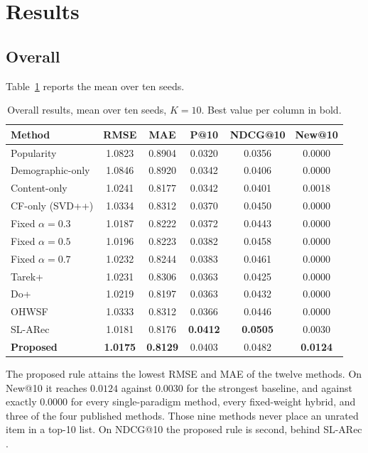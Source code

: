 \documentclass[conference]{IEEEtran}
\begin{document}
\section{Results}
\label{sec:results}

\subsection{Overall}

Table~\ref{tab:overall} reports the mean over ten seeds.

\begin{table}[t]
\caption{Overall results, mean over ten seeds, $K=10$.
Best value per column in bold.}
\label{tab:overall}
\centering
\small
\begin{tabular}{lccccc}
\toprule
Method & RMSE & MAE & P@10 & NDCG@10 & New@10 \\
\midrule
Popularity          & 1.0823 & 0.8904 & 0.0320 & 0.0356 & 0.0000 \\
Demographic-only    & 1.0846 & 0.8920 & 0.0342 & 0.0406 & 0.0000 \\
Content-only        & 1.0241 & 0.8177 & 0.0342 & 0.0401 & 0.0018 \\
CF-only (SVD++)     & 1.0334 & 0.8312 & 0.0370 & 0.0450 & 0.0000 \\
\midrule
Fixed $\alpha = 0.3$ & 1.0187 & 0.8222 & 0.0372 & 0.0443 & 0.0000 \\
Fixed $\alpha = 0.5$ & 1.0196 & 0.8223 & 0.0382 & 0.0458 & 0.0000 \\
Fixed $\alpha = 0.7$ & 1.0232 & 0.8244 & 0.0383 & 0.0461 & 0.0000 \\
\midrule
Tarek+ \cite{tarek2022}    & 1.0231 & 0.8306 & 0.0363 & 0.0425 & 0.0000 \\
Do+ \cite{do2020}          & 1.0219 & 0.8197 & 0.0363 & 0.0432 & 0.0000 \\
OHWSF \cite{ohwsf2025}     & 1.0333 & 0.8312 & 0.0366 & 0.0446 & 0.0000 \\
SL-ARec \cite{slarec2026}  & 1.0181 & 0.8176 & \textbf{0.0412}
                           & \textbf{0.0505} & 0.0030 \\
\midrule
\textbf{Proposed} & \textbf{1.0175} & \textbf{0.8129} & 0.0403
                  & 0.0482 & \textbf{0.0124} \\
\bottomrule
\end{tabular}
\end{table}

The proposed rule attains the lowest RMSE and MAE of the twelve
methods. On New@10 it reaches $0.0124$ against $0.0030$ for the
strongest baseline, and against exactly $0.0000$ for every
single-paradigm method, every fixed-weight hybrid, and three of the
four published methods. Those nine methods never place an unrated
item in a top-10 list. On NDCG@10 the proposed rule is second,
behind SL-ARec \cite{slarec2026}.
\end{document}
